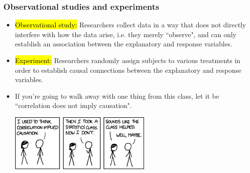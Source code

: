 \begin{frame}
\frametitle{Observational studies and experiments}

\begin{itemize}

\item \hl{Observational study:} Researchers collect data in a way that does not directly interfere with how the data arise, i.e. they merely ``observe", and can only establish an association between the explanatory and response variables.

\pause

\item \hl{Experiment:} Researchers randomly assign subjects to various treatments in order to establish causal connections between the explanatory and response variables.

\pause

\item If you're going to walk away with one thing from this class, let it be ``correlation does not imply causation".

\begin{center}
\includegraphics[width=0.55\textwidth]{1-3_data_collection_principles/figures/xkcd_correlation} \\
{\tiny {}}
\end{center}

\end{itemize}

\end{frame}

